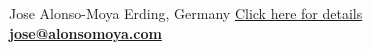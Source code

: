 \documentclass[lighthipster]{simplehipstercv}
\newlength{\rightcolwidth}
\begin{document}
\begin{paracol}{2}
\vfill{} %

\setlength{\parindent}{0pt}
\begin{minipage}[t]{\rightcolwidth}
\begin{center}\fontfamily{\sfdefault}\selectfont \color{black!70}
{\small Jose Alonso-Moya  Erding, Germany  \href{https://calendly.com/josealonso/informal}{Click here for details} \newline
{} \protect\textbf{\url{jose@alonsomoya.com}}
}
\end{center}
\end{minipage}

\end{paracol}
\end{document}
